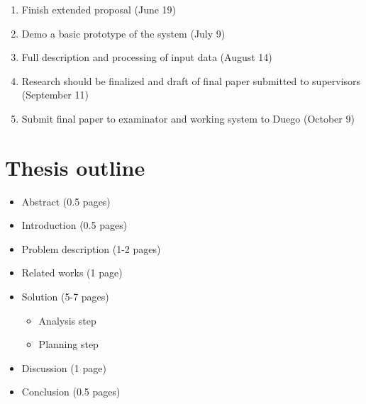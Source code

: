 \documentclass[a4paper]{article}
\begin{document}
\begin{enumerate}
	\item Finish extended proposal (June 19)
	\item Demo a basic prototype of the system (July 9)
	\item Full description and processing of input data (August 14)
	\item Research should be finalized and draft of final paper submitted to supervisors (September 11)
	\item Submit final paper to examinator and working system to Duego (October 9)
\end{enumerate}

\section{Thesis outline}
\begin{itemize}
	\item Abstract (0.5 pages)
	\item Introduction (0.5 pages)
	\item Problem description (1-2 pages)
	\item Related works (1 page)
	\item Solution (5-7 pages)
	\begin{itemize}
		\item Analysis step
		\item Planning step
	\end{itemize}
	\item Discussion (1 page)
	\item Conclusion (0.5 pages)
\end{itemize}


\end{document}
